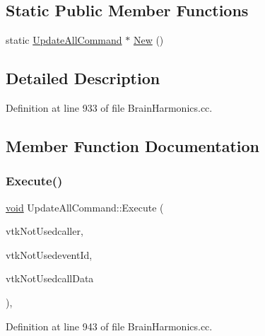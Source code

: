 \subsection*{Static Public Member Functions}
\begin{DoxyCompactItemize}
\item 
static \mbox{\hyperlink{class_update_all_command}{Update\+All\+Command}} $\ast$ \mbox{\hyperlink{class_update_all_command_a97cd6ef1c68bb473aef27c898b175517}{New}} ()
\end{DoxyCompactItemize}


\subsection{Detailed Description}


Definition at line 933 of file Brain\+Harmonics.\+cc.



\subsection{Member Function Documentation}
\mbox{\label{class_update_all_command_aa836cd5d538016289656d8118da879c5}} 
\subsubsection{\texorpdfstring{Execute()}{Execute()}}
{\footnotesize\ttfamily \mbox{\hyperlink{glad_8h_a950fc91edb4504f62f1c577bf4727c29}{void}} Update\+All\+Command\+::\+Execute (\begin{DoxyParamCaption}\item[{vtk\+Object $\ast$}]{vtk\+Not\+Usedcaller,  }\item[{unsigned long }]{vtk\+Not\+Usedevent\+Id,  }\item[{\mbox{\hyperlink{glad_8h_a950fc91edb4504f62f1c577bf4727c29}{void}} $\ast$}]{vtk\+Not\+Usedcall\+Data }\end{DoxyParamCaption})\hspace{0.3cm}{\ttfamily [inline]}, {\ttfamily [override]}}



Definition at line 943 of file Brain\+Harmonics.\+cc.

